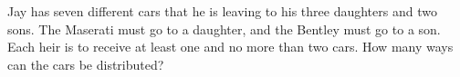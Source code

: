 Jay has seven different cars that he is leaving to his three daughters and two sons. The Maserati must go to a daughter, and the Bentley must go to a son. Each heir is to receive at least one and no more than two cars. How many ways can the cars be distributed?
